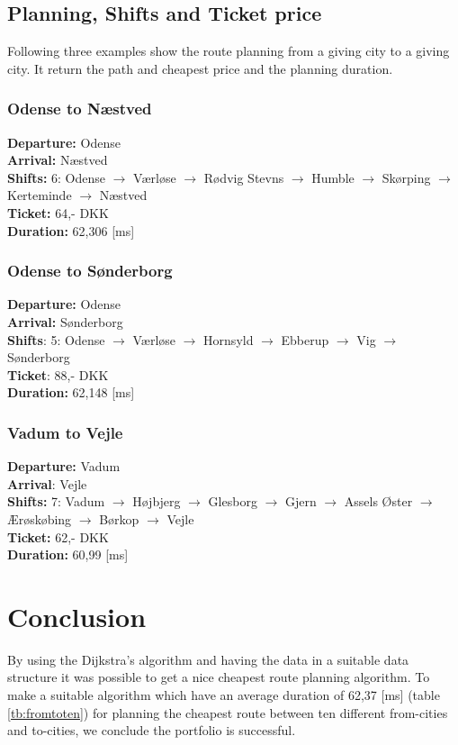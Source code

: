 \subsection{Planning, Shifts and Ticket price}
Following three examples show the route planning from a giving city to a giving city. It return the path and cheapest price and the planning duration.

\subsubsection{Odense to Næstved}
\textbf{Departure:} Odense \\
\textbf{Arrival:}   Næstved \\
\textbf{Shifts:}    6: Odense $\rightarrow$ Værløse $\rightarrow$ Rødvig Stevns $\rightarrow$ Humble $\rightarrow$ Skørping $\rightarrow$ Kerteminde $\rightarrow$ Næstved\\
\textbf{Ticket:}    64,- DKK \\
\textbf{Duration:}  62,306 [ms] 
\subsubsection{Odense to Sønderborg}
\textbf{Departure:} Odense \\
\textbf{Arrival: }  Sønderborg \\ 
\textbf{Shifts}:    5: Odense $\rightarrow$ Værløse $\rightarrow$ Hornsyld $\rightarrow$ Ebberup $\rightarrow$ Vig $\rightarrow$ Sønderborg \\
\textbf{Ticket}:    88,- DKK \\
\textbf{Duration:}  62,148 [ms]
\subsubsection{Vadum to Vejle}
\textbf{Departure:} Vadum\\
\textbf{Arrival}:   Vejle\\
\textbf{Shifts:}    7: Vadum $\rightarrow$ Højbjerg $\rightarrow$ Glesborg $\rightarrow$ Gjern $\rightarrow$ Assels Øster $\rightarrow$ Ærøskøbing $\rightarrow$ Børkop $\rightarrow$ Vejle \\
\textbf{Ticket:}    62,- DKK \\
\textbf{Duration:}  60,99 [ms]

\section{Conclusion}
By using the Dijkstra's algorithm and having the data in a suitable data structure it was possible to get a nice cheapest route planning algorithm. To make a suitable algorithm which have an average duration of 62,37 [ms] (table \ref{tb:fromtoten}) for planning the cheapest route between ten different from-cities and to-cities, we conclude the portfolio is successful. 

